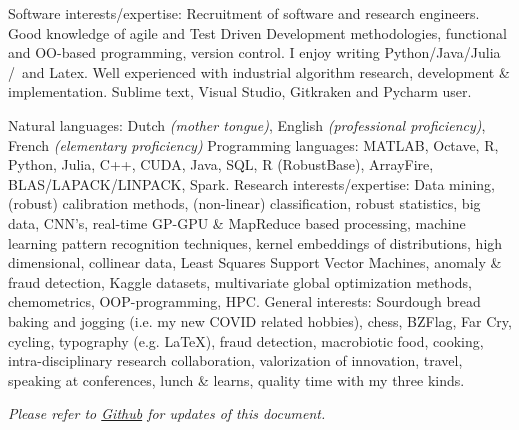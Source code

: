 \documentclass[10pt,a4paper]{article}
\begin{document}
\spacedhrule{1.6em}{-0.4em}


\inlineheadsection  %
{Software interests/expertise:}
{Recruitment of software and research engineers.  Good knowledge of agile and Test Driven Development methodologies, functional and OO-based programming, version control. I enjoy writing \nsp Python/\nsp Java/\nsp Julia /\nsp \CPP~and Latex. Well experienced with industrial algorithm research, development \& implementation. Sublime text, Visual Studio, Gitkraken and Pycharm user.}

\vspace{0.5em}
\inlineheadsection
{Natural languages:}
{Dutch \emph{(mother tongue)}, English \emph{(professional proficiency)}, French \emph{(elementary proficiency)}}
\vspace{0.5em}
\inlineheadsection
{Programming languages:}
{MATLAB, Octave, R, Python, Julia, C++, CUDA, Java, SQL, R (RobustBase), ArrayFire, BLAS/LAPACK/LINPACK, Spark.}
\vspace{0.5em}
\inlineheadsection	
{Research interests/expertise:}
{Data mining, (robust) calibration methods, (non-linear) classification, robust statistics, big data, CNN's, real-time GP-GPU \& MapReduce based processing, machine learning pattern recognition techniques, kernel embeddings of distributions, high dimensional, collinear data, Least Squares Support Vector Machines, anomaly \& fraud detection, Kaggle datasets, multivariate global optimization methods, chemometrics,  OOP-programming, HPC.}
\vspace{0.5em}
\inlineheadsection	
  {General interests:}
  {Sourdough bread baking and jogging (i.e. my new COVID related hobbies), chess, BZFlag, Far Cry, cycling, typography (e.g. \LaTeX), fraud detection, macrobiotic food, cooking, intra-disciplinary research collaboration, valorization of innovation, travel, speaking at conferences, lunch \& learns, quality time with my three kinds.}

\vspace{+2em} 
\begin{center}
	\emph{\small Please refer to \href{https://github.com/ivranckx/CV_Iwein_Vranckx/blob/main/iwein-vranckx-resume.pdf}{Github} for updates of this document.}
\end{center}
\spacedhrule{-0.2em}{-0.4em}
\end{document}
